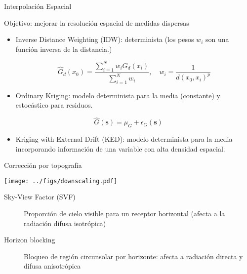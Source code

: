 \documentclass[aspectratio=169, usenames,svgnames,dvipsnames]{beamer}
\begin{document}
\begin{frame}[label={sec:org8c45370}]{Interpolación Espacial}
\begin{block}{\alert{Objetivo}: mejorar la resolución espacial de medidas dispersas}
\begin{itemize}
\item \alert{Inverse Distance Weighting (IDW)}: determinista (los pesos \(w_i\) son una función inversa de la distancia.)

\[
\widehat{G}_d(x_0) = \frac{\sum_{i=1}^N w_i G_{d}(x_i)}{\sum_{i=1}^N w_i}, \quad w_i=\frac  {1}{d(x_0, x_i)^p}
\]

\item \alert{Ordinary Kriging}: modelo determinista para la media (constante) y estocástico para residuos.
\end{itemize}

\[
  \widehat{G}(\mathbf{s}) = \mu_G + \epsilon_G(\mathbf{s})
\]

\begin{itemize}
\item \alert{Kriging with External Drift (KED)}: modelo determinista para la media incorporando información de una variable con alta densidad espacial.
\end{itemize}

\nocite{Journee.Bertrand2010}
\nocite{Antonanzas-Torres.Canizares.ea2013}
\nocite{Bojanowski.Vrieling.ea2013}
\end{block}
\end{frame}


\begin{frame}[label={sec:org3281a5d}]{Corrección por topografía}
\begin{center}
\begin{center}
\texttt{[image: ../figs/downscaling.pdf]}
\end{center}
\end{center}

\begin{description}
\item[{Sky-View Factor (SVF)}] Proporción de cielo visible para un receptor horizontal (afecta a la radiación difusa isotrópica)

\item[{Horizon blocking}] Bloqueo de región circunsolar por horizonte: afecta a radiación directa y difusa anisotrópica
\end{description}


\nocite{Bosch.Batlles.ea2010}
\nocite{Tovar-Pescador.Pozo-Vazquez.ea2006}
\nocite{Antonanzas-Torres.MartinezdePison.ea2013}
\nocite{Hofierka.Suri2002}
\end{frame}
\end{document}

